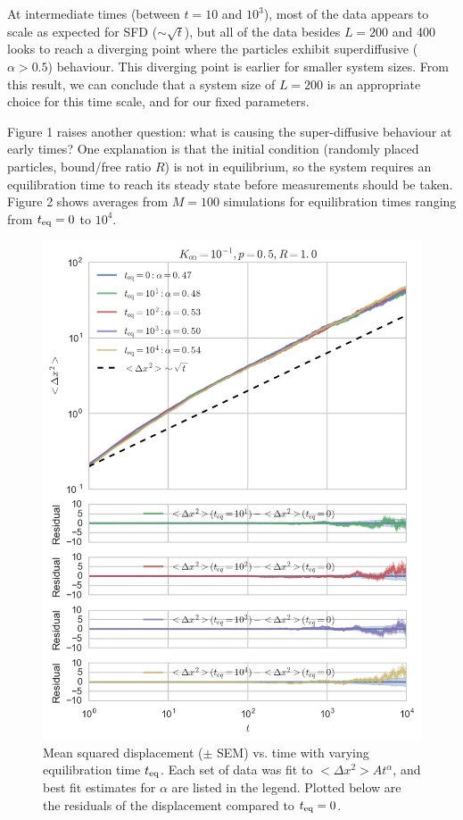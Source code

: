 \documentclass[12pt]{article}
\begin{document}
At intermediate times (between $t = 10$ and $10^3$), most of the data appears to scale as expected for SFD ($\sim \sqrt{t}$), but all of the data besides $L = 200$ and 400 looks to reach a diverging point where the particles exhibit superdiffusive ($\alpha > 0.5$) behaviour.
This diverging point is earlier for smaller system sizes.
From this result, we can conclude that a system size of $L = 200$ is an appropriate choice for this time scale, and for our fixed parameters.

\newpage

Figure 1 raises another question: what is causing the super-diffusive behaviour at early times?
One explanation is that the initial condition (randomly placed particles, bound/free ratio $R$) is not in equilibrium, so the system requires an equilibration time to reach its steady state before measurements should be taken.
Figure 2 shows averages from $M = 100$ simulations for equilibration times ranging from $t_{\rm eq} = 0$ to $10^4$.

\begin{figure}[h!]
    \centering
    \includegraphics[width=0.8\linewidth]{../plots/teq_dependence_resid.png}
    \caption{Mean squared displacement ($\pm$ SEM) vs. time with varying equilibration time $t_{\rm eq}$. Each set of data was fit to $<\Delta x^2> A t^{\alpha}$, and best fit estimates for $\alpha$ are listed in the legend. Plotted below are the residuals of the displacement compared to $t_{\rm eq} = 0$.}
\end{figure}
\end{document}
